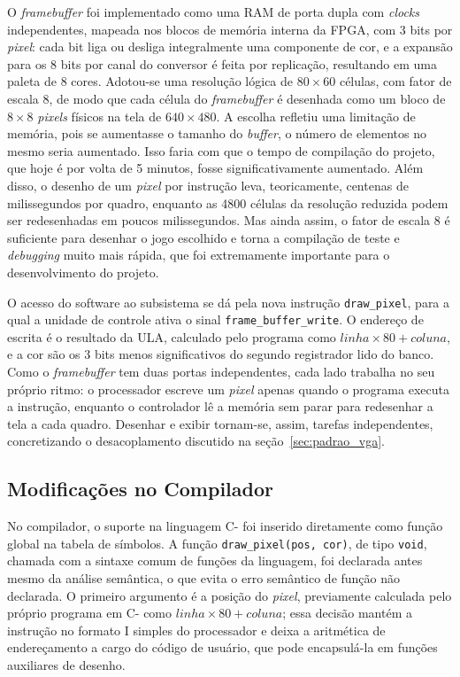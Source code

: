\documentclass[
	12pt,
	oneside,
	a4paper,
	english,
	french,
	spanish,
	brazil,
	]{abntex2}
\begin{document}
O \emph{framebuffer} foi implementado como uma RAM de porta dupla com \emph{clocks} independentes, mapeada nos blocos de memória interna da FPGA, com 3 bits por \emph{pixel}: cada bit liga ou desliga integralmente uma componente de cor, e a expansão para os 8 bits por canal do conversor é feita por replicação, resultando em uma paleta de 8 cores. Adotou-se uma resolução lógica de $80 \times 60$ células, com fator de escala 8, de modo que cada célula do \emph{framebuffer} é desenhada como um bloco de $8 \times 8$ \emph{pixels} físicos na tela de $640 \times 480$. A escolha refletiu uma limitação de memória, pois se aumentasse o tamanho do \emph{buffer}, o número de elementos no mesmo seria aumentado. Isso faria com que o tempo de compilação do projeto, que hoje é por volta de 5 minutos, fosse significativamente aumentado. Além disso, o desenho de um \emph{pixel} por instrução leva, teoricamente, centenas de milissegundos por quadro, enquanto as 4800 células da resolução reduzida podem ser redesenhadas em poucos milissegundos. Mas ainda assim, o fator de escala 8 é suficiente para desenhar o jogo escolhido e torna a compilação de teste e \emph{debugging} muito mais rápida, que foi extremamente importante para o desenvolvimento do projeto.

O acesso do software ao subsistema se dá pela nova instrução \texttt{draw\_pixel}, para a qual a unidade de controle ativa o sinal \texttt{frame\_buffer\_write}. O endereço de escrita é o resultado da ULA, calculado pelo programa como $\mathit{linha} \times 80 + \mathit{coluna}$, e a cor são os 3 bits menos significativos do segundo registrador lido do banco. Como o \emph{framebuffer} tem duas portas independentes, cada lado trabalha no seu próprio ritmo: o processador escreve um \emph{pixel} apenas quando o programa executa a instrução, enquanto o controlador lê a memória sem parar para redesenhar a tela a cada quadro. Desenhar e exibir tornam-se, assim, tarefas independentes, concretizando o desacoplamento discutido na seção~\ref{sec:padrao_vga}.

\subsection{Modificações no Compilador}

No compilador, o suporte na linguagem C- foi inserido diretamente como função global na tabela de símbolos. A função \texttt{draw\_pixel(pos, cor)}, de tipo \texttt{void}, chamada com a sintaxe comum de funções da linguagem, foi declarada antes mesmo da análise semântica, o que evita o erro semântico de função não declarada. O primeiro argumento é a posição do \emph{pixel}, previamente calculada pelo próprio programa em C- como $\mathit{linha} \times 80 + \mathit{coluna}$; essa decisão mantém a instrução no formato I simples do processador e deixa a aritmética de endereçamento a cargo do código de usuário, que pode encapsulá-la em funções auxiliares de desenho.
\end{document}
